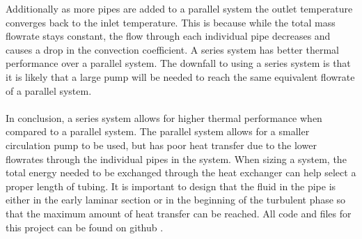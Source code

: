 %
\noindent
Additionally as more pipes are added to a parallel system the outlet temperature converges back to the inlet temperature. This is because while the total mass flowrate stays constant, the flow through each individual pipe decreases and causes a drop in the convection coefficient. A series system has better thermal performance over a parallel system. The downfall to using a series system is that it is likely that a large pump will be needed to reach the same equivalent flowrate of a parallel system. \\ \\
%
In conclusion, a series system allows for higher thermal performance when compared to a parallel system. The parallel system allows for a smaller circulation pump to be used, but has poor heat transfer due to the lower flowrates through the individual pipes in the system. When sizing a system, the total energy needed to be exchanged through the heat exchanger can help select a proper length of tubing. It is important to design that the fluid in the pipe is either in the early laminar section or in the beginning of the turbulent phase so that the maximum amount of heat transfer can be reached. All code and files for this project can be found on github \cite{github}.

